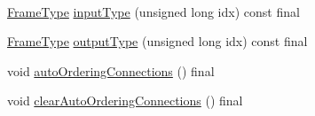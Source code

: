 \begin{DoxyCompactItemize}
$$\item 
\hyperlink{_frame_lib___types_8h_ad495a9f61af7fff07d7e97979d1ab854}{Frame\+Type} \hyperlink{class_frame_lib___d_s_p_abbe65d74de56ab71e7fba34380bd19dc}{input\+Type} (unsigned long idx) const final
\item 
\hyperlink{_frame_lib___types_8h_ad495a9f61af7fff07d7e97979d1ab854}{Frame\+Type} \hyperlink{class_frame_lib___d_s_p_a14154f7fe15aa51b683e56e8a368b9ad}{output\+Type} (unsigned long idx) const final
\item 
void \hyperlink{class_frame_lib___d_s_p_a6584230fa17c0b76a045fd1ec99f0482}{auto\+Ordering\+Connections} () final
\item 
void \hyperlink{class_frame_lib___d_s_p_a8c9843103d691ed57e3e265528f575be}{clear\+Auto\+Ordering\+Connections} () final
\end{DoxyCompactItemize}
